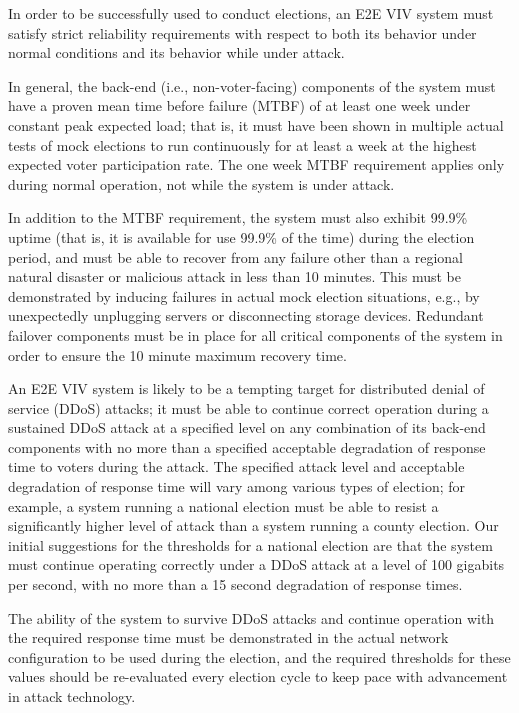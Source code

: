 In order to be successfully used to conduct elections, an E2E VIV
system must satisfy strict reliability requirements with respect to
both its behavior under normal conditions and its behavior while under
attack.

In general, the back-end (i.e., non-voter-facing) components of the
system must have a proven mean time before failure (MTBF) of at least
one week under constant peak expected load; that is, it must have been
shown in multiple actual tests of mock elections to run continuously
for at least a week at the highest expected voter participation
rate. The one week MTBF requirement applies only during normal
operation, not while the system is under attack.

In addition to the MTBF requirement, the system must also exhibit
99.9\% uptime (that is, it is available for use 99.9\% of the time)
during the election period, and must be able to recover from any
failure other than a regional natural disaster or malicious attack in
less than 10 minutes. This must be demonstrated by inducing failures
in actual mock election situations, e.g., by unexpectedly unplugging
servers or disconnecting storage devices. Redundant failover
components must be in place for all critical components of the system
in order to ensure the 10 minute maximum recovery time.

An E2E VIV system is likely to be a tempting target for distributed
denial of service (DDoS) attacks; it must be able to continue correct
operation during a sustained DDoS attack at a specified level on any
combination of its back-end components with no more than a specified
acceptable degradation of response time to voters during the
attack. The specified attack level and acceptable degradation of
response time will vary among various types of election; for example,
a system running a national election must be able to resist a
significantly higher level of attack than a system running a county
election. Our initial suggestions for the thresholds for a national
election are that the system must continue operating correctly under a
DDoS attack at a level of 100 gigabits per second, with no more than a
15 second degradation of response times.

The ability of the system to survive DDoS attacks and continue
operation with the required response time must be demonstrated in the
actual network configuration to be used during the election, and the
required thresholds for these values should be re-evaluated every
election cycle to keep pace with advancement in attack technology.

